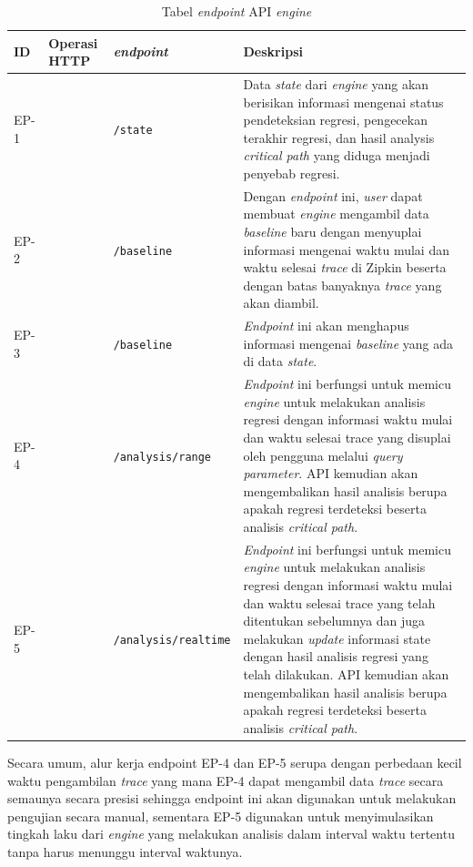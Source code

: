 \begin{small}
	\begin{longtable}{ | p{1cm} | p{2cm} | p{3.5cm} | p{7.5cm} | }
		\caption{Tabel \textit{endpoint} API \textit{engine}}
		\label{endpoints}                                                           
		\\ \hline
		\centering\bfseries{ID} & \centering\bfseries{Operasi HTTP} & \centering\bfseries{\textit{endpoint}} & \centering\bfseries{Deskripsi} \tabularnewline \hline
		\endfirsthead
		EP-1 & \centering{GET} & \centering\texttt{/state} & Data \textit{state} dari \textit{engine} yang akan berisikan informasi mengenai status pendeteksian regresi, pengecekan terakhir regresi, dan hasil analysis \textit{critical path} yang diduga menjadi penyebab regresi. \\ \hline
		EP-2 & \centering{POST} & \centering\texttt{/baseline} & Dengan \textit{endpoint} ini, \textit{user} dapat membuat \textit{engine} mengambil data \textit{baseline} baru dengan menyuplai informasi mengenai waktu mulai dan waktu selesai \textit{trace} di Zipkin beserta dengan batas banyaknya \textit{trace} yang akan diambil. \\ \hline
		EP-3 & \centering{DELETE} & \centering\texttt{/baseline} & \textit{Endpoint} ini akan menghapus informasi mengenai \textit{baseline} yang ada di data \textit{state}. \\ \hline	
		EP-4 & \centering{GET} & \centering\texttt{/analysis/range} & \textit{Endpoint} ini berfungsi untuk memicu \textit{engine} untuk melakukan analisis regresi dengan informasi waktu mulai dan waktu selesai trace yang disuplai oleh pengguna melalui \textit{query parameter}. API kemudian akan mengembalikan hasil analisis berupa apakah regresi terdeteksi beserta analisis \textit{critical path}. \\ \hline
		EP-5 & \centering{GET} & \centering\texttt{/analysis/realtime} & \textit{Endpoint} ini berfungsi untuk memicu \textit{engine} untuk melakukan analisis regresi dengan informasi waktu mulai dan waktu selesai trace yang telah ditentukan sebelumnya dan juga melakukan \textit{update} informasi state dengan hasil analisis regresi yang telah dilakukan. API kemudian akan mengembalikan hasil analisis berupa apakah regresi terdeteksi beserta analisis \textit{critical path}. \\ \hline				
	\end{longtable}
\end{small}

Secara umum, alur kerja endpoint EP-4 dan EP-5 serupa dengan perbedaan kecil waktu pengambilan \textit{trace} yang mana EP-4 dapat mengambil data \textit{trace} secara semaunya secara presisi sehingga endpoint ini akan digunakan untuk melakukan pengujian secara manual, sementara EP-5 digunakan untuk menyimulasikan tingkah laku dari \textit{engine} yang melakukan analisis dalam interval waktu tertentu tanpa harus menunggu interval waktunya.

